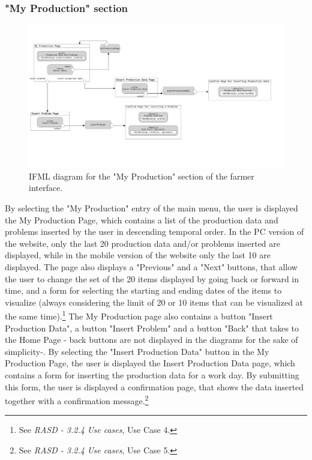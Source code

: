 \documentclass{article}
\begin{document}
\subsubsection{"My Production" section}
\begin{figure}[H]
    \centering
     \includegraphics[scale=0.1]{diagrams/ui diagrams/farmer/my production.png}
    \caption{IFML diagram for the "My Production" section of the farmer interface.}
\end{figure}
By selecting the "My Production" entry of the main menu, the user is displayed the My Production Page, which contains a list of the production data and problems inserted by the user in descending temporal order. In the PC version of the website, only the last 20 production data and/or problems inserted are displayed, while in the mobile version of the website only the last 10 are displayed. The page also displays a "Previous" and a "Next" buttons, that allow the user to change the set of the 20 items displayed by going back or forward in time, and a form for selecting the starting and ending dates of the items to visualize (always considering the limit of 20 or 10 items that can be visualized at the same time).\footnote{See \textit{RASD - 3.2.4 Use cases}, Use Case 4.} The My Production page also contains a button "Insert Production Data", a button "Insert Problem" and a button "Back" that takes to the Home Page - back buttons are not displayed in the diagrams for the sake of simplicity-.\newline
By selecting the "Insert Production Data" button in the My Production Page, the user is displayed the Insert Production Data page, which contains a form for inserting the production data for a work day. By submitting this form, the user is displayed a confirmation page, that shows the data inserted together with a confirmation message.\footnote{See \textit{RASD - 3.2.4 Use cases}, Use Case 5.}\newline
\end{document}
